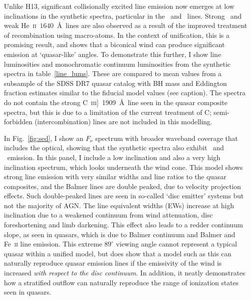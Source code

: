 Unlike H13, significant collisionally excited line emission now emerges
at low inclinations in the synthetic spectra, particular in the \civ\ and \nv\
lines. Strong \la\ and
weak He~\textsc{ii}~$1640$~\AA\ lines are also observed
as a result of the improved treatment of recombination using macro-atoms. 
In the context of unification, this is a promising result, 
and shows that a biconical wind can produce significant 
emission at `quasar-like' angles. To demonstrate this further,
I show line luminosities and monochromatic continuum luminosities
from the synthetic spectra in table~\ref{line_lums}. These are compared to
mean values from a subsample of the SDSS DR7 quasar catalog \citep{shen2011} 
with BH mass and Eddington fraction estimates similar to the fiducial model values 
(see caption). The spectra do not contain the strong 
C~\textsc{iii}]~1909~\AA\ line seen in the quasar composite spectra, 
but this is due to a limitation of the current treatment of C; semi-forbidden
(intercombination) lines are not included in this modelling.

In Fig.~\ref{fig:sed}, I show an $F_{\nu}$ spectrum with broader waveband coverage
that includes the optical, showing that the synthetic spectra 
also exhibit \ha\ and \hb\ emission. 
In this panel, I include a low inclination and 
also a very high inclination 
spectrum, which looks underneath the wind cone. This model shows 
strong line emission with very similar widths and line ratios to the quasar composites, and
the Balmer lines are double peaked, due to velocity projection effects.  
Such double-peaked lines are seen in so-called `disc emitter' systems 
\citep[e.g.][]{eracleous1994} but not the majority of AGN.     
The line equivalent widths (EWs) increase at high inclination
due to a weakened continuum from wind attenuation, 
disc foreshortening and limb darkening. This effect also 
leads to a redder continuum slope, as seen in quasars, which is
due to Balmer continuum and Balmer and Fe~\textsc{ii} line emission.
This extreme $89^\circ$ viewing angle cannot represent a typical quasar within a unified model,
but does show that a model such as this can naturally reproduce quasar emission lines
if the emissivity of the wind is increased {\em with respect to the disc continuum}.
In addition, it neatly demonstrates how a stratified outflow can naturally
reproduce the range of ionization states seen in quasars. 

